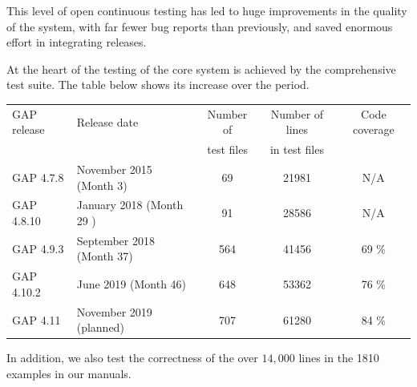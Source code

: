 This level of open continuous testing has led to huge improvements in
the quality of the system, with far fewer bug reports than previously,
and saved enormous effort in integrating releases.

At the heart of the testing of the core \GAP system is achieved by 
the comprehensive test suite. The table below shows its increase
over the period.

\begin{center}
\begin{tabular}{| l | l | c | c | c |} 
\hline
GAP release & Release date & Number of        & Number of lines & Code coverage \\
            &              & test files       & in test files   &               \\
\hline GAP 4.7.8  & November 2015 (Month 3)   & 69 & 21981 & N/A \\
\hline GAP 4.8.10 & January 2018 (Month 29 )  & 91 & 28586 & N/A \\
\hline GAP 4.9.3  & September 2018 (Month 37) & 564 & 41456 & 69 \% \\
\hline GAP 4.10.2 & June 2019 (Month 46)      & 648 & 53362 & 76 \% \\
\hline GAP 4.11   & November 2019 (planned)   & 707 & 61280 & 84 \% \\
\hline
\end{tabular}
\end{center}

In addition, we also test the correctness of the
over $14,000$ lines in the 1810 examples in our manuals.
%
%

